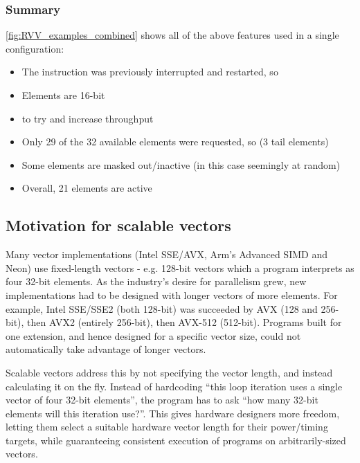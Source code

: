 \subsubsection{Summary}
\cref{fig:RVV_examples_combined} shows all of the above features used in a single configuration:
\begin{itemize}
    \item The instruction was previously interrupted and restarted, so 
    \item Elements are 16-bit
    \item {} to try and increase throughput
    \item Only 29 of the 32 available elements were requested, so  (3 tail elements)
    \item Some elements are masked out/inactive (in this case seemingly at random)
    \item Overall, 21 elements are active
\end{itemize}

\pagebreak
\subsection{Motivation for scalable vectors}
Many vector implementations (Intel SSE/AVX, Arm's Advanced SIMD and Neon) use fixed-length vectors - e.g. 128-bit vectors which a program interprets as four 32-bit elements.
As the industry's desire for parallelism grew, new implementations had to be designed with longer vectors of more elements.
For example, Intel SSE/SSE2 (both 128-bit) was succeeded by AVX (128 and 256-bit), then AVX2 (entirely 256-bit), then AVX-512 (512-bit).
Programs built for one extension, and hence designed for a specific vector size, could not automatically take advantage of longer vectors.

Scalable vectors address this by not specifying the vector length, and instead calculating it on the fly.
Instead of hardcoding \enquote{this loop iteration uses a single vector of four 32-bit elements}, the program has to ask \enquote{how many 32-bit elements will this iteration use?}.
This gives hardware designers more freedom, letting them select a suitable hardware vector length for their power/timing targets, while guaranteeing consistent execution of programs on arbitrarily-sized vectors.
